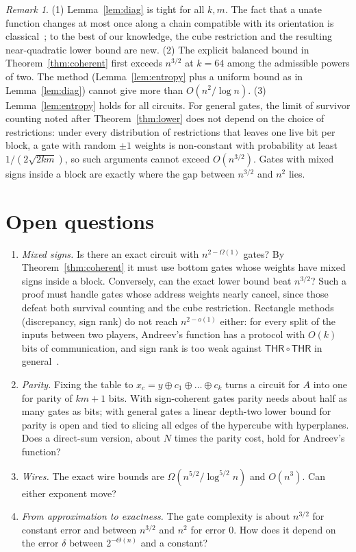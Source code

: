 \documentclass[11pt,letterpaper]{article}
\theoremstyle{remark}
\newtheorem*{remark}{Remark}
\newcommand{\THR}{\mathsf{THR}}
\begin{document}
\begin{remark}
(1) Lemma~\ref{lem:diag} is tight for all $k,m$. The fact that a
unate function changes at most once along a chain compatible with its
orientation is classical~\cite[Lemma~2.1]{IPS}; to the best of our knowledge,
the cube restriction and the resulting near-quadratic lower bound are new.
(2) The explicit balanced bound in Theorem~\ref{thm:coherent} first exceeds
$n^{3/2}$ at $k=64$ among the admissible powers of two. The method
(Lemma~\ref{lem:entropy} plus a uniform bound as in Lemma~\ref{lem:diag})
cannot give more than $O(n^2/\log n)$. (3) Lemma~\ref{lem:entropy} holds for
all circuits. For general gates, the limit of survivor counting noted after
Theorem~\ref{thm:lower} does not depend on the choice of restrictions: under
every distribution of restrictions that leaves one live bit per block, a
gate with random $\pm1$ weights is non-constant with probability at least
$1/(2\sqrt{2km})$, so such arguments cannot exceed $O(n^{3/2})$. Gates with mixed signs inside a block are exactly where
the gap between $n^{3/2}$ and $n^2$ lies.
\end{remark}


\section{Open questions}\label{sec:open}

\begin{enumerate}
\item \emph{Mixed signs.} Is there an exact circuit with $n^{2-\Omega(1)}$
  gates? By Theorem~\ref{thm:coherent} it must use bottom gates whose weights
  have mixed signs inside a block. Conversely, can the exact lower bound beat
  $n^{3/2}$? Such a proof must handle gates whose address weights nearly
  cancel, since those defeat both survival counting and the cube restriction.
  Rectangle methods (discrepancy, sign rank) do not reach $n^{2-o(1)}$
  either: for every split of the inputs between two players, Andreev's
  function has a protocol with $O(k)$ bits of communication, and sign rank
  is too weak against $\THR\circ\THR$ in general~\cite{CM}.
\item \emph{Parity.} Fixing the table to $x_c=y\oplus c_1\oplus\dots\oplus c_k$
  turns a circuit for $A$ into one for parity of $km+1$ bits. With
  sign-coherent gates parity needs about half as many gates as bits; with
  general gates a linear depth-two lower bound for parity is open and tied to
  slicing all edges of the hypercube with hyperplanes. Does a direct-sum
  version, about $N$ times the parity cost, hold for Andreev's function?
\item \emph{Wires.} The exact wire bounds are $\Omega(n^{5/2}/\log^{5/2}n)$
  and $O(n^3)$. Can either exponent move?
\item \emph{From approximation to exactness.} The gate complexity is about
  $n^{3/2}$ for constant error and between $n^{3/2}$ and $n^2$ for error $0$.
  How does it depend on the error $\delta$ between $2^{-\Theta(n)}$ and a
  constant?
\end{enumerate}
\end{document}
